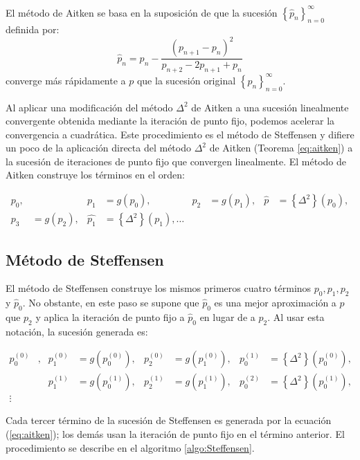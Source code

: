 \begin{theorem}
El método de Aitken se basa en la suposición de que la sucesión $\left\lbrace \hat{p}_n\right\rbrace_{n=0}^\infty$ definida
por:
\begin{equation}
	\hat{p}_n = p_n - \dfrac{\left(p_{n+1}-p_n \right)^2}{p_{n+2}-2p_{n+1}+p_n}
	\label{eq:aitken}
\end{equation}
converge más rápidamente a $p$ que la sucesión original $\left\lbrace p_n\right\rbrace_{n=0}^\infty$.
\end{theorem}

Al aplicar una modificación del método $\Delta^2$ de Aitken a una sucesión linealmente convergente obtenida mediante la iteración 
de punto fijo, podemos acelerar la convergencia a cuadrática. Este procedimiento es el método de Steffensen y difiere un poco de 
la aplicación directa del método $\Delta^2$ de Aitken (Teorema \ref{eq:aitken}) a la sucesión de iteraciones de punto fijo
que convergen linealmente. El método de Aitken construye los términos en el orden:

\begin{align*}
	p_0,& & p_1&=g(p_0), & p_2 &= g(p_1), & \hat{p} &= \left\lbrace \Delta^2\right\rbrace(p_0),\\
	p_3&=g(p_2), & \hat{p_1} &= \left\lbrace \Delta^2\right\rbrace(p_1),\dots
\end{align*}


\subsection{Método de Steffensen}
El método de Steffensen construye los mismos primeros cuatro términos $p_0, p_1, p_2$ y $\hat{p}_0$. No obstante, en este paso
se supone que $\hat{p}_0$ es una mejor aproximación a $p$ que $p_2$ y aplica la iteración de punto fijo a $\hat{p}_0$ en lugar
de a $p_2$. Al usar esta notación, la sucesión generada es:

\begin{align*}
	p_0^{(0)}&, & p_1^{(0)}&=g\left(p_0^{(0)}\right), & p_2^{(0)}&=g\left(p_1^{(0)}\right), & 
	p_0^{(1)}&=\left\lbrace \Delta^2\right\rbrace \left(p_0^{(0)}\right), \\
	& & p_1^{(1)}&=g\left(p_0^{(1)}\right), & p_2^{(1)}&=g\left(p_1^{(1)}\right), &
	p_0^{(2)}&=\left\lbrace \Delta^2\right\rbrace \left(p_0^{(1)}\right), \\\vdots
\end{align*}

Cada tercer término de la sucesión de Steffensen es generada por la ecuación (\ref{eq:aitken}); los demás usan la iteración de 
punto fijo en el término anterior. El procedimiento se describe en el algoritmo \ref{algo:Steffensen}.

